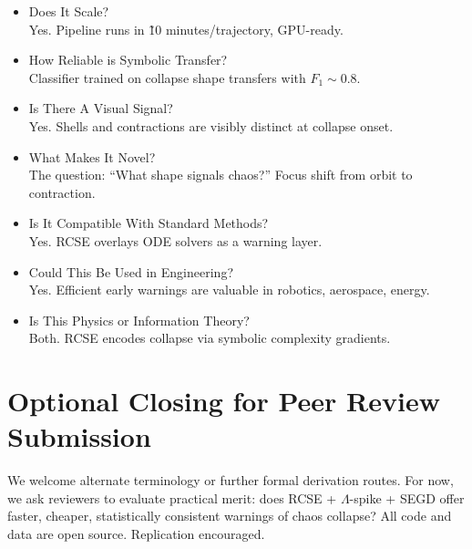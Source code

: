 \documentclass[12pt]{article}
\begin{document}
\begin{itemize}
\item Does It Scale?\\
Yes. Pipeline runs in \~10 minutes/trajectory, GPU-ready.

\item How Reliable is Symbolic Transfer?\\
Classifier trained on collapse shape transfers with \( F_1 \sim 0.8 \).

\item Is There A Visual Signal?\\
Yes. Shells and contractions are visibly distinct at collapse onset.

\item What Makes It Novel?\\
The question: ``What shape signals chaos?'' Focus shift from orbit to contraction.

\item Is It Compatible With Standard Methods?\\
Yes. RCSE overlays ODE solvers as a warning layer.

\item Could This Be Used in Engineering?\\
Yes. Efficient early warnings are valuable in robotics, aerospace, energy.

\item Is This Physics or Information Theory?\\
Both. RCSE encodes collapse via symbolic complexity gradients.

\end{itemize}

\section*{Optional Closing for Peer Review Submission}

We welcome alternate terminology or further formal derivation routes. For now, we ask reviewers to evaluate practical merit: does RCSE + \( \Lambda \)-spike + SEGD offer faster, cheaper, statistically consistent warnings of chaos collapse? All code and data are open source. Replication encouraged.
\end{document}
